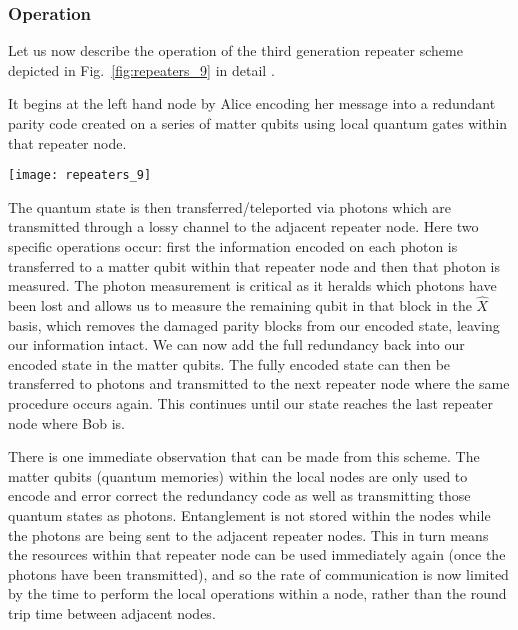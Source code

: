 \subsubsection{Operation}

Let us now describe the operation of the third generation repeater scheme  depicted in Fig.~\ref{fig:repeaters_9} in detail \cite{bib:munro12, bib:MKLLJ14}.

It begins at the left hand node by Alice encoding her message into a redundant parity code created on a series of matter qubits using local quantum gates within that repeater node.

\begin{figure*}[!htb]
\texttt{[image: repeaters\_9]}
\caption{Schematic illustration of the transmission of a quantum signal using loss based error correction codes in a quantum network.}
\label{fig:repeaters_9}
\end{figure*}

The quantum state is then transferred/teleported via photons which are transmitted through a lossy channel to the adjacent repeater node. Here two specific operations occur: first the information encoded on each photon is transferred to a matter qubit within that repeater node and then that photon is measured. The photon measurement is critical as it heralds which photons have been lost and allows us to measure the remaining qubit in that block in the $\hat{X}$ basis, which removes the damaged parity blocks from our encoded state, leaving our information intact. We can now add the full redundancy back into our encoded state in the matter qubits. The fully encoded state can then be transferred to photons and transmitted to the next repeater node where the same procedure occurs again. This continues until our state reaches the last repeater node where Bob is.

There is one immediate observation that can be made from this scheme. The matter qubits (quantum memories) within the local nodes are only used to encode and error correct the redundancy code as well as transmitting those quantum states as photons. Entanglement is not stored within the nodes while the photons are being sent to the adjacent repeater nodes. This in turn means the resources within that repeater node can be used immediately again (once the photons have been transmitted), and so the rate of communication is now limited by the time to perform the local operations within a node, rather than the round trip time between adjacent nodes. 

